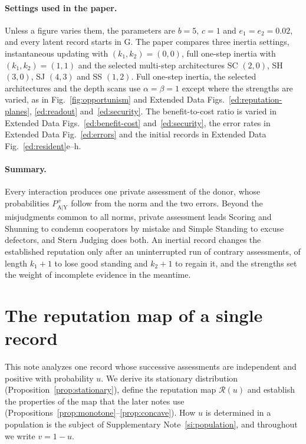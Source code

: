 \documentclass[10pt]{wlscirep}
\newcommand{\Rmap}{\mathscr{R}}            %
\newcommand{\Pp}[1]{P^{+}_{\mathrm{#1}}}   %
\theoremstyle{plain}
\theoremstyle{remark}
\begin{document}
\paragraph{Settings used in the paper.} Unless a figure varies them, the parameters are $b=5$, $c=1$ and $e_1=e_2=0.02$, and every latent record starts in G. The paper compares three inertia settings, instantaneous updating with $(k_1,k_2)=(0,0)$, full one-step inertia with $(k_1,k_2)=(1,1)$ and the selected multi-step architectures SC $(2,0)$, SH $(3,0)$, SJ $(4,3)$ and SS $(1,2)$. Full one-step inertia, the selected architectures and the depth scans use $\alpha=\beta=1$ except where the strengths are varied, as in Fig.~\ref{fig:opportunism} and Extended Data Figs.~\ref{ed:reputation-planes}, \ref{ed:readout} and~\ref{ed:security}. The benefit-to-cost ratio is varied in Extended Data Figs.~\ref{ed:benefit-cost} and~\ref{ed:security}, the error rates in Extended Data Fig.~\ref{ed:errors} and the initial records in Extended Data Fig.~\ref{ed:resident}e--h.

\paragraph{Summary.} Every interaction produces one private assessment of the donor, whose probabilities $\Pp{A|Y}$ follow from the norm and the two errors. Beyond the misjudgments common to all norms, private assessment leads Scoring and Shunning to condemn cooperators by mistake and Simple Standing to excuse defectors, and Stern Judging does both. An inertial record changes the established reputation only after an uninterrupted run of contrary assessments, of length $k_1+1$ to lose good standing and $k_2+1$ to regain it, and the strengths set the weight of incomplete evidence in the meantime.

\FloatBarrier
\section{The reputation map of a single record}
\label{si:map}

This note analyzes one record whose successive assessments are independent and positive with probability $u$. We derive its stationary distribution (Proposition~\ref{prop:stationary}), define the reputation map $\Rmap(u)$ and establish the properties of the map that the later notes use (Propositions~\ref{prop:monotone}--\ref{prop:concave}). How $u$ is determined in a population is the subject of Supplementary Note~\ref{si:population}, and throughout we write $v=1-u$.
\end{document}
